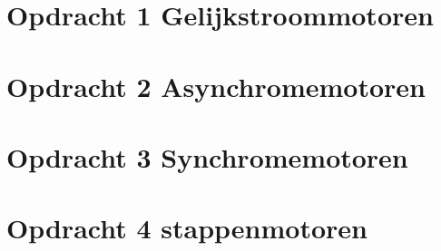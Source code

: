 \documentclass{article}
\begin{document}
\section*{Opdracht 1 Gelijkstroommotoren}


\newpage
\section*{Opdracht 2 Asynchromemotoren}


\newpage
\section*{Opdracht 3 Synchromemotoren}


\newpage
\section*{Opdracht 4 stappenmotoren}

\end{document}
